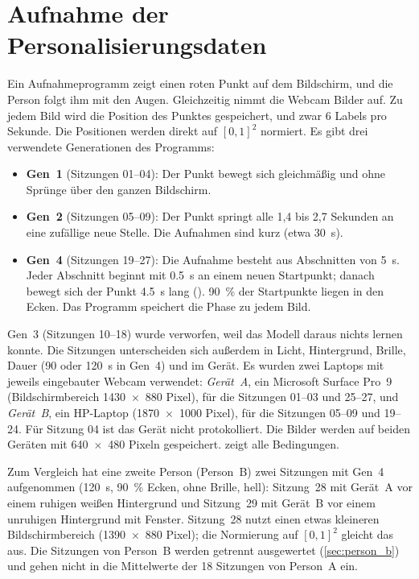 \section{Aufnahme der Personalisierungsdaten}
\label{sec:meth_aufnahme}
Ein Aufnahmeprogramm zeigt einen roten Punkt auf dem Bildschirm, und die
Person folgt ihm mit den Augen. Gleichzeitig nimmt die Webcam Bilder auf. Zu
jedem Bild wird die Position des Punktes gespeichert, und zwar 6 Labels pro
Sekunde. Die Positionen werden direkt auf $[0,1]^2$ normiert. Es gibt drei verwendete
Generationen des Programms:
\begin{itemize}
  \item \textbf{Gen~1} (Sitzungen 01--04): Der Punkt bewegt sich gleichmäßig
        und ohne Sprünge über den ganzen Bildschirm.
  \item \textbf{Gen~2} (Sitzungen 05--09): Der Punkt springt alle 1,4 bis 2,7
        Sekunden an eine zufällige neue Stelle. Die Aufnahmen sind kurz (etwa
        \SI{30}{\second}).
  \item \textbf{Gen~4} (Sitzungen 19--27): Die Aufnahme besteht aus Abschnitten
        von \SI{5}{\second}. Jeder Abschnitt beginnt mit \SI{0,5}{\second}
         an einem neuen Startpunkt; danach bewegt sich der Punkt
        \SI{4,5}{\second} lang (). \SI{90}{\percent} der
        Startpunkte liegen in den Ecken. Das Programm speichert die Phase zu
        jedem Bild.
\end{itemize}
Gen~3 (Sitzungen 10--18) wurde verworfen, weil das Modell daraus nichts lernen
konnte. Die Sitzungen unterscheiden sich außerdem in Licht, Hintergrund,
Brille, Dauer (90 oder \SI{120}{\second} in Gen~4) und im Gerät. Es wurden
zwei Laptops mit jeweils eingebauter Webcam verwendet: \emph{Gerät~A}, ein
Microsoft Surface Pro~9 (Bildschirmbereich \num{1430}~$\times$~\num{880}
Pixel), für die Sitzungen 01--03 und 25--27, und \emph{Gerät~B}, ein
HP-Laptop (\num{1870}~$\times$~\num{1000} Pixel), für die Sitzungen 05--09
und 19--24. Für Sitzung 04 ist das Gerät nicht
protokolliert. Die Bilder werden auf beiden Geräten mit
\num{640}~$\times$~\num{480} Pixeln gespeichert.
 zeigt alle Bedingungen.

Zum Vergleich hat eine zweite Person (Person~B) zwei Sitzungen mit Gen~4
aufgenommen (\SI{120}{\second}, \SI{90}{\percent} Ecken, ohne Brille, hell):
Sitzung~28 mit Gerät~A vor einem ruhigen weißen Hintergrund und Sitzung~29 mit
Gerät~B vor einem unruhigen Hintergrund mit Fenster. Sitzung~28 nutzt einen
etwas kleineren Bildschirmbereich (\num{1390}~$\times$~\num{880} Pixel); die
Normierung auf $[0,1]^2$ gleicht das aus. Die Sitzungen von Person~B werden
getrennt ausgewertet (\cref{sec:person_b}) und gehen nicht in die Mittelwerte
der 18 Sitzungen von Person~A ein.

